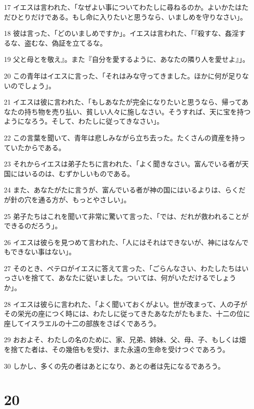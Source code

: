 \par 17 イエスは言われた、「なぜよい事についてわたしに尋ねるのか。よいかたはただひとりだけである。もし命に入りたいと思うなら、いましめを守りなさい」。
\par 18 彼は言った、「どのいましめですか」。イエスは言われた、「『殺すな、姦淫するな、盗むな、偽証を立てるな。
\par 19 父と母とを敬え』。また『自分を愛するように、あなたの隣り人を愛せよ』」。
\par 20 この青年はイエスに言った、「それはみな守ってきました。ほかに何が足りないのでしょう」。
\par 21 イエスは彼に言われた、「もしあなたが完全になりたいと思うなら、帰ってあなたの持ち物を売り払い、貧しい人々に施しなさい。そうすれば、天に宝を持つようになろう。そして、わたしに従ってきなさい」。
\par 22 この言葉を聞いて、青年は悲しみながら立ち去った。たくさんの資産を持っていたからである。
\par 23 それからイエスは弟子たちに言われた、「よく聞きなさい。富んでいる者が天国にはいるのは、むずかしいものである。
\par 24 また、あなたがたに言うが、富んでいる者が神の国にはいるよりは、らくだが針の穴を通る方が、もっとやさしい」。
\par 25 弟子たちはこれを聞いて非常に驚いて言った、「では、だれが救われることができるのだろう」。
\par 26 イエスは彼らを見つめて言われた、「人にはそれはできないが、神にはなんでもできない事はない」。
\par 27 そのとき、ペテロがイエスに答えて言った、「ごらんなさい、わたしたちはいっさいを捨てて、あなたに従いました。ついては、何がいただけるでしょうか」。
\par 28 イエスは彼らに言われた、「よく聞いておくがよい。世が改まって、人の子がその栄光の座につく時には、わたしに従ってきたあなたがたもまた、十二の位に座してイスラエルの十二の部族をさばくであろう。
\par 29 おおよそ、わたしの名のために、家、兄弟、姉妹、父、母、子、もしくは畑を捨てた者は、その幾倍もを受け、また永遠の生命を受けつぐであろう。
\par 30 しかし、多くの先の者はあとになり、あとの者は先になるであろう。

\chapter{20}


